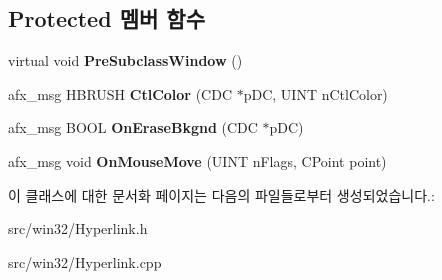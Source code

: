 \subsection*{Protected 멤버 함수}
\begin{DoxyCompactItemize}
\item 
\mbox{\label{class_hyperlink_a8825e770ef8eaebc598f887f8344b03a}} 
virtual void {\bfseries Pre\+Subclass\+Window} ()
\item 
\mbox{\label{class_hyperlink_a2b38eff4e51bdefd6f2158b0c8625659}} 
afx\+\_\+msg H\+B\+R\+U\+SH {\bfseries Ctl\+Color} (C\+DC $\ast$p\+DC, U\+I\+NT n\+Ctl\+Color)
\item 
\mbox{\label{class_hyperlink_a0af05ff8e84693b9bb575a814c2e46b9}} 
afx\+\_\+msg B\+O\+OL {\bfseries On\+Erase\+Bkgnd} (C\+DC $\ast$p\+DC)
\item 
\mbox{\label{class_hyperlink_a72fe2dbc81212528289454a7d13393c6}} 
afx\+\_\+msg void {\bfseries On\+Mouse\+Move} (U\+I\+NT n\+Flags, C\+Point point)
\end{DoxyCompactItemize}


이 클래스에 대한 문서화 페이지는 다음의 파일들로부터 생성되었습니다.\+:\begin{DoxyCompactItemize}
\item 
src/win32/Hyperlink.\+h\item 
src/win32/Hyperlink.\+cpp\end{DoxyCompactItemize}
